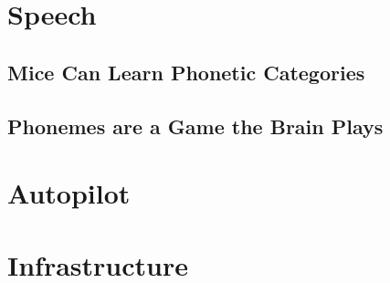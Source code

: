 
\maketitle
\clearpage



\tableofcontents%
%
\mainmatter



\part{Speech}

\chapter{Mice Can Learn Phonetic Categories}





\chapter{Phonemes are a Game the Brain Plays}



\part{Autopilot}





\part{Infrastructure}





\begin{fullwidth}



\end{fullwidth}
